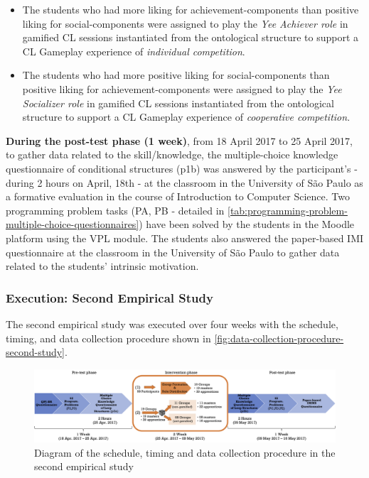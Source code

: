 \begin{itemize}
\item The students who had more liking for achievement-components than positive liking for social-components were assigned to play the \emph{Yee Achiever role} in gamified CL sessions instantiated from the ontological structure  to support a CL Gameplay experience of \emph{individual competition}.
\item The students who had more positive liking for social-components than positive liking for achievement-components were assigned to play the \emph{Yee Socializer role} in gamified CL sessions instantiated from the ontological structure  to support a CL Gameplay experience of \emph{cooperative competition}.
\end{itemize}

\textbf{During the post-test phase (1 week)}, from 18 April 2017 to 25 April 2017, to gather data related to the skill/knowledge, the multiple-choice knowledge questionnaire of conditional structures (p1b) was answered by the participant’s - during 2 hours on April, 18th - at the classroom in the University of São Paulo as a formative evaluation in the course of Introduction to Computer Science.
Two programming problem tasks (PA, PB - detailed in \autoref{tab:programming-problem-multiple-choice-questionnaires}) have been solved by the students in the Moodle platform using the VPL module.
The students also answered the paper-based IMI questionnaire at the classroom in the University of São Paulo to gather data related to the students' intrinsic motivation. 

\subsubsection{Execution: Second Empirical Study}

The second empirical study was executed over four weeks with the schedule, timing, and data collection procedure shown in \autoref{fig:data-collection-procedure-second-study}.

\begin{figure}[htb]
 \caption{Diagram of the schedule, timing and data collection procedure in the second empirical study}
 \label{fig:data-collection-procedure-second-study}
 \centering
 \includegraphics[width=1\textwidth]{images/chap-evaluation/data-collection-procedure-second-study.png}
 \fautor
\end{figure}

